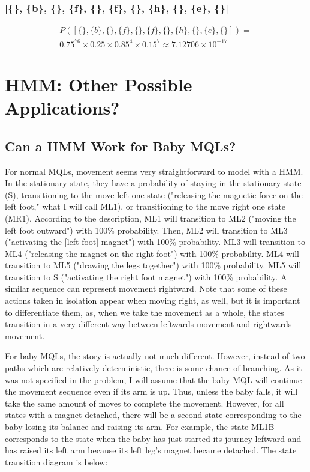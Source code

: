 \documentclass{article}
\begin{document}
\subsubsection{[\{\}, \{b\}, \{\}, \{f\}, \{\}, \{f\}, \{\}, \{h\}, \{\}, \{e\}, \{\}]}

$$
\begin{gathered}
P([\{\}, \{b\}, \{\}, \{f\}, \{\}, \{f\}, \{\}, \{h\}, \{\}, \{e\}, \{\}]) = \\
0.75^{76} \times 0.25 \times 0.85^{4} \times 0.15^{7} \approx 7.12706 \times 10^{-17}
\end{gathered}
$$

\section{HMM: Other Possible Applications?}

\subsection{Can a HMM Work for Baby MQLs?}

For normal MQLs, movement seems very straightforward to model with a HMM. In the 
stationary state, they have a probability of staying in the stationary state (S), 
transitioning to the move left one state ("releasing the magnetic force on the 
left foot," what I will call ML1), or transitioning to the move 
right one state (MR1). According to the description, ML1 will transition to ML2 ("moving 
the left foot outward") with 100\% probability. Then, ML2 will transition to 
ML3 ("activating the [left foot] magnet") with 100\% probability. ML3 will 
transition to ML4 ("releasing the magnet on the right foot") with 100\% 
probability. ML4 will transition to ML5 ("drawing the legs together") with 100\% 
probability. ML5 will transition to S ("activating the right foot magnet") 
with 100\% probability. A similar sequence can represent movement rightward. 
Note that some of these actions taken in isolation 
appear when moving right, as well, but it is important to differentiate them, 
as, when we 
take the movement as a whole, the states transition in a very different way 
between leftwards movement and rightwards movement.

For baby MQLs, the story is actually not much different. However, instead of 
two paths which are relatively deterministic, there is some chance of branching. 
As it was not specified in the problem, I will assume that the baby MQL will 
continue the movement sequence even if its arm is up. Thus, unless the baby 
falls, it will take the same amount of moves to complete the movement. However, 
for all states with a magnet detached, there will be a second state 
corresponding to the baby losing its balance and raising its arm. For example, 
the state ML1B corresponds to the state when the baby has just started its 
journey leftward and has raised its left arm because its left leg's magnet 
became detached. The state transition diagram is below:
\end{document}
